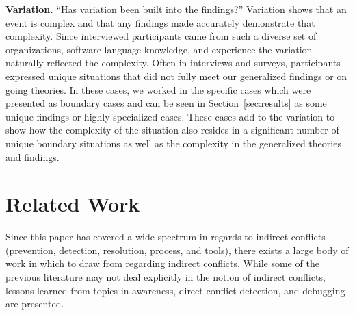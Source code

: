 \documentclass[conference]{IEEEtran}
\begin{document}
{\bfseries Variation.} ``Has variation been built into the findings?'' Variation shows that an event is complex and that any findings
made accurately demonstrate that complexity. Since interviewed participants came from such a diverse set of organizations, 
software language knowledge, and experience the variation naturally reflected the complexity. Often in interviews and surveys, participants
expressed unique situations that did not fully meet our generalized findings or on going theories. In these cases, we worked in the specific
cases which were presented as boundary cases and can be seen in Section~\ref{sec:results} as some unique findings or highly
specialized cases. These cases add to the variation
to show how the complexity of the situation also resides in a significant number of unique boundary situations as well as the complexity
in the generalized theories and findings.

\section{Related Work}
\label{sec:related}

Since this paper has covered a wide spectrum in regards to indirect conflicts (prevention, detection, resolution, process, and tools), there
exists a large body of work in which to draw from regarding indirect conflicts. While some of the previous literature may not deal explicitly
in the notion of indirect conflicts, lessons learned from topics in awareness, direct conflict detection, and debugging are presented.
\end{document}
